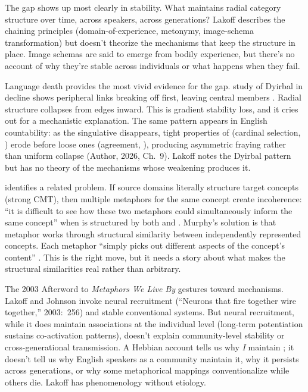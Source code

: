 \documentclass[12pt]{article}
\begin{document}
The gap shows up most clearly in stability. What maintains radial category structure over time, across speakers, across generations? Lakoff describes the chaining principles (domain-of-experience, metonymy, image-schema transformation) but doesn't theorize the mechanisms that keep the structure in place. Image schemas are said to emerge from bodily experience, but there's no account of why they're stable across individuals or what happens when they fail.

Language death provides the most vivid evidence for the gap.  study of Dyirbal in decline shows peripheral links breaking off first, leaving central members \citep[as discussed in][Ch.~6]{lakoff1987}. Radial structure collapses from edges inward. This is gradient stability loss, and it cries out for a mechanistic explanation. The same pattern appears in English countability: as the singulative  disappears, tight properties of  (cardinal selection, ) erode before loose ones (agreement, ), producing asymmetric fraying rather than uniform collapse (Author, 2026, Ch.~9). Lakoff notes the Dyirbal pattern but has no theory of the mechanisms whose weakening produces it.

\textcite{murphy1996} identifies a related problem. If source domains literally structure target concepts (strong CMT), then multiple metaphors for the same concept create incoherence: \enquote{it is difficult to see how these two metaphors could simultaneously inform the same concept} when  is structured by both  and  \citep[186]{murphy1996}. Murphy's solution is that metaphor works through structural similarity between independently represented concepts. Each metaphor \enquote{simply picks out different aspects of the concept's content} \citep[196]{murphy1996}. This is the right move, but it needs a story about what makes the structural similarities real rather than arbitrary.

The 2003 Afterword to \emph{Metaphors We Live By} gestures toward mechanisms. Lakoff and Johnson invoke neural recruitment (\enquote{Neurons that fire together wire together,} 2003:~256) and stable conventional systems. But neural recruitment, while it does maintain associations at the individual level (long-term potentiation sustains co-activation patterns), doesn't explain community-level stability or cross-generational transmission. A Hebbian account tells us why \emph{I} maintain ; it doesn't tell us why English speakers as a community maintain it, why it persists across generations, or why some metaphorical mappings conventionalize while others die. Lakoff has phenomenology without etiology.
\end{document}
